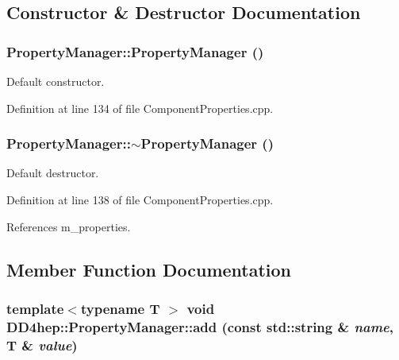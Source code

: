 \subsection{Constructor \& Destructor Documentation}
\hypertarget{class_d_d4hep_1_1_property_manager_a3b65b75bae28db832e98a38aec5774c6}{
\subsubsection[{PropertyManager}]{\setlength{\rightskip}{0pt plus 5cm}PropertyManager::PropertyManager ()}}
\label{class_d_d4hep_1_1_property_manager_a3b65b75bae28db832e98a38aec5774c6}


Default constructor. 

Definition at line 134 of file ComponentProperties.cpp.\hypertarget{class_d_d4hep_1_1_property_manager_aa16d7f0cb2a2baaa3b3afbe6239aac39}{
\subsubsection[{$\sim$PropertyManager}]{\setlength{\rightskip}{0pt plus 5cm}PropertyManager::$\sim$PropertyManager ()}}
\label{class_d_d4hep_1_1_property_manager_aa16d7f0cb2a2baaa3b3afbe6239aac39}


Default destructor. 

Definition at line 138 of file ComponentProperties.cpp.

References m\_\-properties.

\subsection{Member Function Documentation}
\hypertarget{class_d_d4hep_1_1_property_manager_a7c6b9ce5ed0c66ff6018b3ab1aad183a}{
\subsubsection[{add}]{\setlength{\rightskip}{0pt plus 5cm}template$<$typename T $>$ void DD4hep::PropertyManager::add (const std::string \& {\em name}, \/  {\bf T} \& {\em value})}}
\label{class_d_d4hep_1_1_property_manager_a7c6b9ce5ed0c66ff6018b3ab1aad183a}


